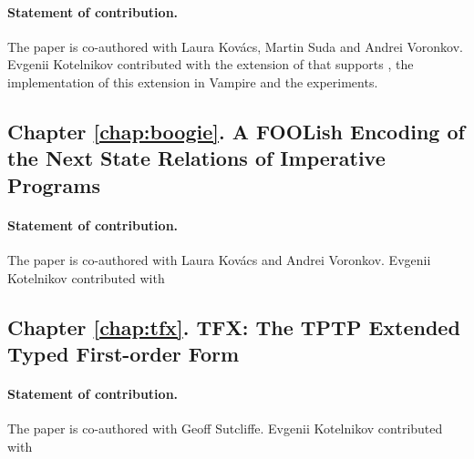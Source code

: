 \paragraph{Statement of contribution.} The paper is co-authored with Laura Kov\'{a}cs, Martin Suda and Andrei Voronkov. Evgenii Kotelnikov contributed with the extension of \newcnf{} that supports \folb{}, the implementation of this extension in Vampire and the experiments.

\subsection*{Chapter \ref{chap:boogie}. A FOOLish Encoding of the Next State Relations of Imperative Programs}

\paragraph{Statement of contribution.} The paper is co-authored with Laura Kov\'{a}cs and Andrei Voronkov. Evgenii Kotelnikov contributed with 

\subsection*{Chapter \ref{chap:tfx}. TFX: The TPTP Extended Typed First-order Form}

\paragraph{Statement of contribution.} The paper is co-authored with Geoff Sutcliffe. Evgenii Kotelnikov contributed with 
